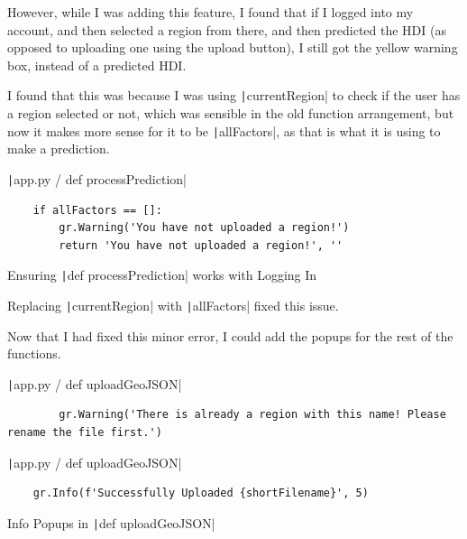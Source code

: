 \documentclass[12pt]{report}
\newcommand{\pil}[1]{\protect\texttt|#1|}
\begin{document}
However, while I was adding this feature, I found that if I logged into my account, and then selected a region from there, and then predicted the HDI (as opposed to uploading one using the upload button), I still got the yellow warning box, instead of a predicted HDI.

I found that this was because I was using \pil{currentRegion} to check if the user has a region selected or not, which was sensible in the old function arrangement, but now it makes more sense for it to be \pil{allFactors}, as that is what it is using to make a prediction.

\begin{listing}[H]
\pil{app.py / def processPrediction}
\begin{verbatim}
    if allFactors == []:
        gr.Warning('You have not uploaded a region!')
        return 'You have not uploaded a region!', ''
\end{verbatim}
\caption{Ensuring \pil{def processPrediction} works with Logging In}\label{cs:processAccountRegion}
\end{listing}

Replacing \pil{currentRegion} with \pil{allFactors} fixed this issue.

\begin{center}
\end{center}

Now that I had fixed this minor error, I could add the popups for the rest of the functions.

\begin{listing}[H]
\pil{app.py / def uploadGeoJSON}
\begin{verbatim}
        gr.Warning('There is already a region with this name! Please rename the file first.')
\end{verbatim}
\pil{app.py / def uploadGeoJSON}
\begin{verbatim}
    gr.Info(f'Successfully Uploaded {shortFilename}', 5)
\end{verbatim}
\caption{Info Popups in \pil{def uploadGeoJSON}}\label{cs:infoPopups2}
\end{listing}
\end{document}
